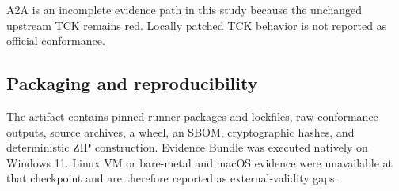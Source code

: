 A2A is an incomplete evidence path in this study because the unchanged upstream TCK remains red. Locally patched TCK behavior is not reported as official conformance.

\subsection{Packaging and reproducibility}
The artifact contains pinned runner packages and lockfiles, raw conformance outputs, source archives, a wheel, an SBOM, cryptographic hashes, and deterministic ZIP construction. Evidence Bundle \evidenceid{} was executed natively on Windows 11. Linux VM or bare-metal and macOS evidence were unavailable at that checkpoint and are therefore reported as external-validity gaps.
